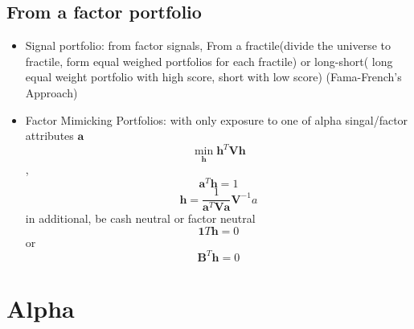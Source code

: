 \documentclass[11pt, openany]{book}              %
\begin{document}
\subsection{From a factor portfolio}

\begin{itemize}
	\item Signal portfolio: from factor signals, From a fractile(divide the universe to fractile, form equal weighed portfolios for each fractile) or long-short( long equal weight portfolio with high score, short with low score) (Fama-French's Approach)
	\item Factor Mimicking Portfolios: with only exposure to one of alpha singal/factor attributes $\mathbf{a}$
	$$ \min_{\mathbf{h}}  \mathbf{h}^T  \mathbf{V}  \mathbf{h}$$, $$ \mathbf{a}^T  \mathbf{h} = 1$$
	$$ \mathbf{h} = \frac{1}{ \mathbf{a}^T \mathbf{V} \mathbf{a}} \mathbf{V}^{-1}a$$
	in additional, be cash neutral or factor neutral
	$$ \mathbf{1}T\mathbf{h} = 0$$ or $$\mathbf{B}^T \mathbf{h} = 0 $$
\end{itemize}


\section{Alpha}
\end{document}
